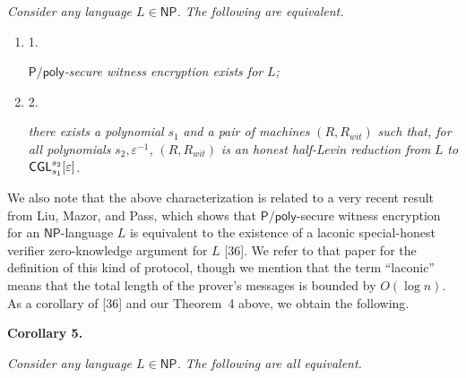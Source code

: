 \emph{Consider any language $L\in{\mathsf{NP}}$. The following are equivalent.}\par


\begin{enumerate}


\item[] 
1. 


${\mathsf{P}}/{\mathsf{poly}}$\emph{-secure witness encryption exists for }$L$\emph{;}\par





\item[] 
2. 


\emph{there exists a polynomial }$s_{1}$\emph{ and a pair of machines }$(R,R_{wit})$\emph{ such that, for all polynomials }$s_{2},\varepsilon^{-1}$\emph{, }$(R,R_{wit})$\emph{ is an honest half-Levin reduction from }$L$\emph{ to }${\sf CGL}^{s_{2}}_{s_{1}}[\varepsilon]$\emph{.}\par





\end{enumerate}






We also note that the above characterization is related to a very recent result from Liu, Mazor, and Pass, which shows that ${\mathsf{P}}/{\mathsf{poly}}$-secure witness encryption for an ${\mathsf{NP}}$-language $L$ is equivalent to the existence of a laconic special-honest verifier zero-knowledge argument for $L$ [36]. We refer to that paper for the definition of this kind of protocol, though we mention that the term “laconic” means that the total length of the prover’s messages is bounded by $O(\log n)$. As a corollary of [36] and our Theorem 4 above, we obtain the following.\par





\par\medskip\noindent\textbf{
\textbf{Corollary 5}\textbf{.}
}\par



\emph{Consider any language $L\in{\mathsf{NP}}$. The following are all equivalent.}\par


